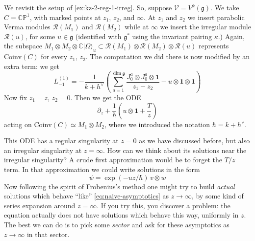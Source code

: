 \documentclass[12pt,letterpaper,reqno]{amsart}
\numberwithin{equation}{section}
\newcommand{\fg}{{\mathfrak g}}
\newcommand{\bbC}{\ensuremath{\mathbb C}}
\newcommand{\bbP}{\ensuremath{\mathbb P}}
\newcommand\bid{{\mathbf 1}}
\newcommand\vac{{|\Omega\rangle}}
\newcommand{\vertex}{\mathcal{V}}
\newcommand{\vrep}{\mathcal{R}}
\newcommand{\Coinv}{{\mathrm{Coinv}}}
\newcommand{\ti}[1]{\textit{#1}}
\begin{document}
We revisit the setup of \autoref{ex:kz-2-reg-1-irreg}.
So, suppose $\vertex = V^k(\fg)$.
We take $C = \bbC \bbP^1$, with marked points at $z_1$, $z_2$, and $\infty$.
At $z_1$ and $z_2$ we insert parabolic 
Verma modules $\vrep(M_1)$ and $\vrep(M_2)$
while at $\infty$ we insert the irregular module $\vrep(u)$, for some $u \in \fg$ (identified with $\fg^*$ using the invariant pairing $\kappa$.)
Again, the subspace $M_1 \otimes M_2 \otimes \bbC \vac_u \subset \vrep(M_1) \otimes \vrep(M_2) \otimes \vrep(u)$ 
represents $\Coinv(C)$ for every $z_1$, $z_2$.
The computation we did there is now modified by an extra term: we get
\begin{equation}
  L^{(1)}_{-1} = - \frac{1}{k + h^\vee} \left( \sum_{a=1}^{\dim \fg} \frac{J^a_0 \otimes J^a_0 \otimes \bid}{z_1 - z_2} - u \otimes \bid \otimes \bid \right)
\end{equation}
Now fix $z_1 = z$, $z_2 = 0$. Then we get the ODE
\begin{equation} \label{eq:kz-irregular}
  \partial_z + \frac{1}{\hbar}  \left( u \otimes \bid + \frac{T}{z} \right)
\end{equation}
acting on $\Coinv(C) \simeq M_1 \otimes M_2$, where we introduced
the notation $\hbar = k + h^\vee$.

This ODE has a regular singularity at $z=0$ as we have discussed
before, but also an irregular singularity at $z=\infty$.
How can we think about its solutions near the irregular singularity? 
A crude first approximation would be to forget the $T / z$ term.
In that approximation we could write solutions in the form
\begin{equation} \label{eq:naive-asymptotics}
  \psi = \exp(-u z / \hbar) \, v \otimes w
\end{equation}
Now following the spirit of Frobenius's method one might try to build
\ti{actual} solutions which behave ``like'' \eqref{eq:naive-asymptotics}
as $z \to \infty$, by some kind of series expansion around $z = \infty$.
If you try this, you discover a problem: the equation actually does not
have solutions which behave this way, uniformly in $z$. The best we 
can do is to pick some \ti{sector} and ask for these asymptotics
as $z \to \infty$ in that sector.
\end{document}
